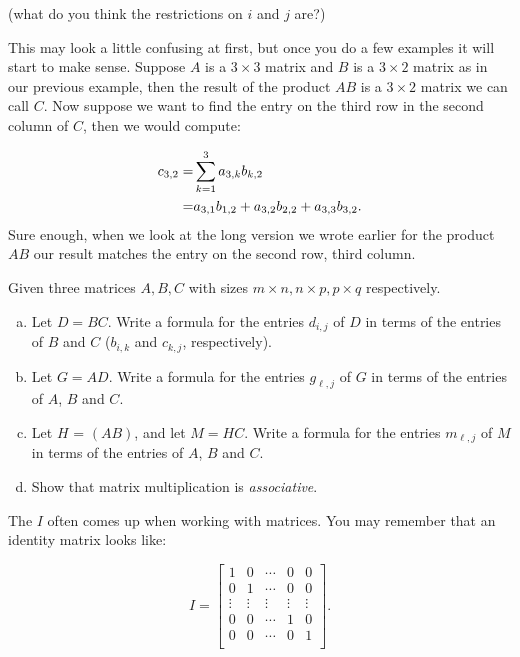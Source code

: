 (what do you think the restrictions on $i$ and $j$ are?)

This may look a little confusing at first, but once you do a few examples it will start to make sense.  Suppose ${A}$ is a $3 \times 3$ matrix and ${B}$ is a $3 \times 2$ matrix as in our previous example, then the result of the product ${A} {B}$ is a $3 \times 2 $ matrix we can call ${C}$.  Now suppose we want to find the entry on the third row in the second column of ${C}$, then we would compute:

\begin{align}
{c}_{3,2} =& \sum_{k=1}^3 a_{3,k} b_{k,2} \notag\\
=& a_{3,1} b_{1,2} + a_{3,2} b_{2,2} + a_{3,3} b_{3,2}.  \notag
\end{align}
Sure enough, when we look at the long version we wrote earlier for the product ${AB}$ our result matches the entry on the second row, third column.

\begin{exercise}{}
Given three matrices $A, B, C$ with sizes $m \times n, n \times p, p \times q$ respectively.
\begin{enumerate}[(a)]
\item
Let $D = BC$.  Write a formula for the entries $d_{i,j}$ of $D$ in terms of the entries of $B$ and $C$ ($b_{i,k}$ and $c_{k,j}$, respectively). 
\item
Let $G = AD$.  Write a formula for the entries $g_{\ell,j}$ of $G$ in terms of the entries of $A$, $B$ and $C$.
\item
Let $H$ =  $(AB)$, and let $M = HC$. Write a formula for the entries $m_{\ell,j}$ of $M$ in terms of the entries of $A$, $B$ and $C$.
\item
Show that matrix multiplication is \emph{associative}.
\end{enumerate}
\end{exercise}

The  $I$ often comes up when working with matrices. You may remember that an identity matrix looks like:

\[I = \left[ \begin{array}{ccccc}
1 & 0  & \cdots & 0 & 0 \\
0 & 1  & \cdots & 0 & 0  \\
\vdots & \vdots & \vdots & \vdots & \vdots\\
0 & 0  & \cdots & 1 & 0  \\
0 & 0  & \cdots & 0 & 1  \\
 \end{array} \right]. \]

